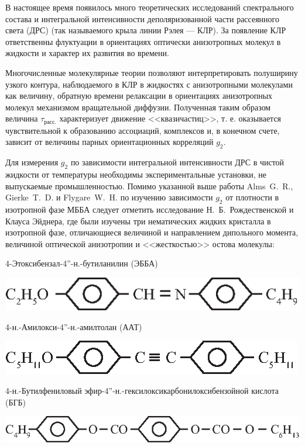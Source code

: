 
В настоящее время появилось много теоретических исследований спектрального состава и интегральной интенсивности деполяризованной части рассеянного света (ДРС) (так называемого крыла линии Рэлея --- КЛР). За появление КЛР ответственны флуктуации в ориентациях оптически анизотропных молекул в жидкости и характер их развития во времени.

Многочисленные молекулярные теории позволяют интерпретировать полуширину узкого контура, наблюдаемого в КЛР в жидкостях с анизотропными молекулами как величину, обратную времени релаксации в ориентациях анизотропных молекул механизмом вращательной диффузии.
Полученная таким образом величина $\tau_{расс.}$ характеризует движение 
<<квазичастиц>>, т. е. оказывается чувствительной к образованию ассоциаций, комплексов и, в конечном счете, зависит от величины парных ориентационных корреляций $g_2$. 

Для измерения $g_2$ по зависимости интегральной интенсивности ДРС в чистой жидкости от температуры необходимы экспериментальные установки, не выпускаемые промышленностью.
Помимо указанной выше работы Alms~G.~R., Gierke~T.~D. и Flygare~W.~H. по изучению зависимости $g_2$ от плотности в изотропной фазе МББА следует отметить исследование Н.~Б.~Рождественской
и Клауса Эйднера, где были изучены три нематических 
жидких кристалла в изотропной фазе,
отличающиеся величиной и направлением дипольного момента, 
величиной оптической анизотропии и <<жесткостью>> остова молекулы:

4-Этоксибензал-4''-н.-бутиланилин (ЭББА)


\centerline{\hbox{\includegraphics[scale=1]{Ris/ris_eps/ris5exp01.eps}}}

4-н.-Амилокси-4''-н.-амилтолан (ААТ)


\centerline{\hbox{\includegraphics[scale=1]{Ris/ris_eps/ris5exp02.eps}}}

4-н.-Бутилфениловый эфир-4''-н.-гексилоксикарбонилоксибензойной кислота (БГБ)


\centerline{\hbox{\includegraphics[scale=1]{Ris/ris_eps/ris5exp03.eps}}}

